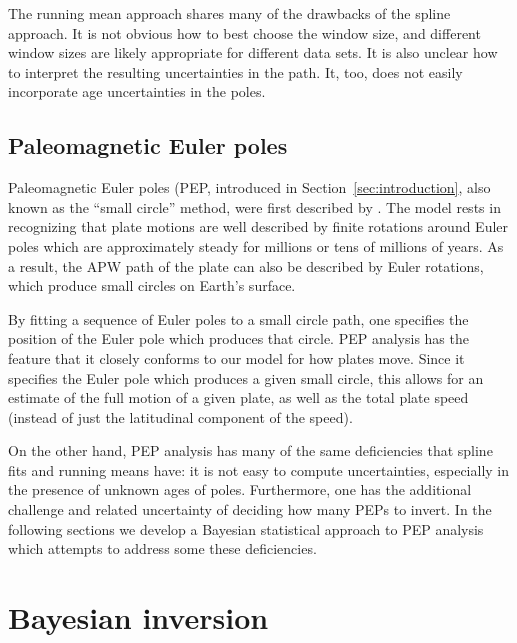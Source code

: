 \documentclass[preprint,12pt,authoryear]{elsarticle}
\begin{document}
The running mean approach shares many of the drawbacks of the spline approach. 
It is not obvious how to best choose the window size, and different window sizes are
likely appropriate for different data sets. 
It is also unclear how to interpret the resulting uncertainties in the path.
It, too, does not easily incorporate age uncertainties in the poles.

\subsection{Paleomagnetic Euler poles}
Paleomagnetic Euler poles (PEP, introduced in Section~\ref{sec:introduction}, 
also known as the ``small circle'' method, were first described by \citet{gordon1984paleomagnetic}.
The model rests in recognizing that plate motions are well described by finite
rotations around Euler poles which are approximately steady for millions or 
tens of millions of years. As a result, the APW path of the plate
can also be described by Euler rotations, which
produce small circles on Earth's surface.

By fitting a sequence of Euler poles to a small circle path, one specifies
the position of the Euler pole which produces that circle.
PEP analysis has the feature that it closely conforms to our model for how plates move.
Since it specifies the Euler pole which produces a given small circle,
this allows for an estimate of the full motion of a given plate, 
as well as the total plate speed (instead of just the latitudinal component of the speed).

On the other hand, PEP analysis has many of the same
deficiencies that spline fits and running means have: it is not easy to compute
uncertainties, especially in the presence of unknown ages of poles.
Furthermore, one has the additional challenge and related uncertainty of deciding how many PEPs to invert.
In the following sections we develop a Bayesian statistical approach to
PEP analysis which attempts to address some these deficiencies.

\section{Bayesian inversion}
\label{sec:bayesian_inversion}
\end{document}
